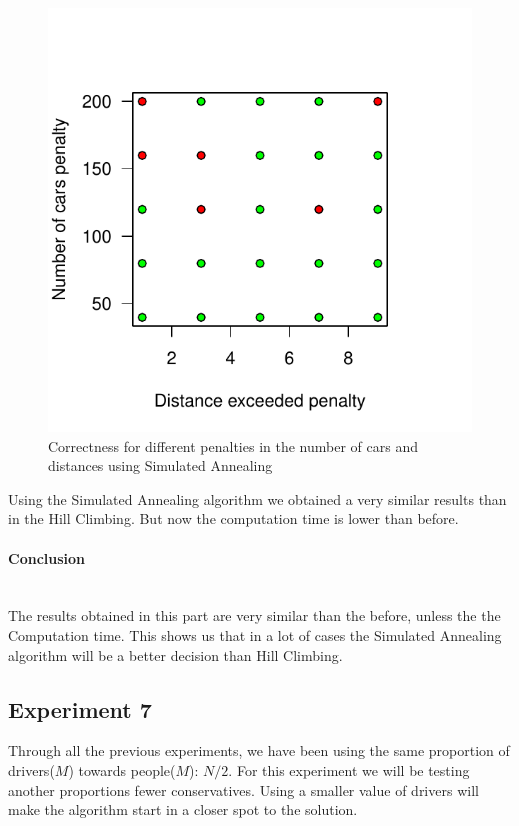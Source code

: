 \documentclass[12]{article}
\begin{document}
\begin{figure}[H]
  \captionsetup{justification=centering}
   \centering
    \includegraphics[scale=0.8]{Results/data_6_4.pdf}
      \caption{Correctness for different penalties in the number of cars and distances using Simulated Annealing}
      \label{fig:data_6_4}
  \end{figure}
    \vspace{1cm}
    
Using the Simulated Annealing algorithm we obtained a very similar results than in the Hill Climbing. But now the computation time is lower than before. 

\paragraph{Conclusion}\mbox{}\\

The results obtained in this part are very similar than the before, unless the the Computation time. This shows us that in a lot of cases the Simulated Annealing algorithm will be a better decision than Hill Climbing.

\subsection{Experiment 7}
Through all the previous experiments, we have been using the same proportion of drivers($M$) towards people($M$): $N/2$. For this experiment we will be testing another proportions fewer conservatives. Using a smaller value of drivers will make the algorithm start in a closer spot to the solution.
\end{document}
